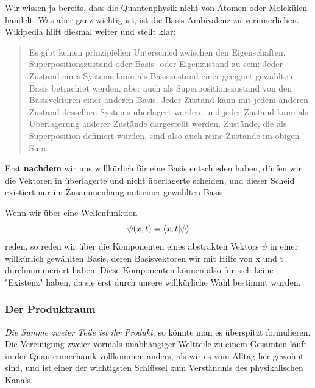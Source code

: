 \documentclass[12pt]{book}
\begin{document}
Wir wissen ja bereits, dass die Quantenphysik nicht von Atomen oder Molekülen handelt. Was aber ganz wichtig ist, ist die Basis-Ambivalenz zu verinnerlichen. Wikipedia hilft diesmal weiter und stellt klar:

\begin{quote}\begin{tcolorbox}
Es gibt keinen prinzipiellen Unterschied zwischen den Eigenschaften, Superpositionszustand oder Basis- oder Eigenzustand zu sein: Jeder Zustand eines Systems kann als Basiszustand einer geeignet gewählten Basis betrachtet werden, aber auch als Superpositionszustand von den Basisvektoren einer anderen Basis. Jeder Zustand kann mit jedem anderen Zustand desselben Systems überlagert werden, und jeder Zustand kann als Überlagerung anderer Zustände dargestellt werden. Zustände, die als Superposition definiert wurden, sind also auch reine Zustände im obigen Sinn.
\end{tcolorbox}\end{quote}
Erst \textbf{nachdem} wir uns willkürlich für eine Basis entschieden haben, dürfen wir die Vektoren in überlagerte und nicht überlagerte scheiden, und dieser Scheid existiert nur im Zusammenhang mit einer gewählten Basis.

Wenn wir über eine Wellenfunktion
\begin{equation*} 
\psi(x,t) = \braket{x,t}{\psi}
\end{equation*} 
reden, so reden wir über die Komponenten eines abstrakten Vektors $\psi$ in einer willkürlich gewählten Basis, deren Basisvektoren wir mit Hilfe von x und t durchnummeriert haben. Diese Komponenten können also für sich keine "Existenz" haben, da sie erst durch unsere willkürliche Wahl bestimmt wurden. 

\subsubsection{Der Produktraum}

\emph{Die Summe zweier Teile ist ihr Produkt}, so könnte man es überspitzt formulieren. Die Vereinigung zweier vormals unabhängiger Weltteile zu einem Gesamten läuft in der Quantenmechanik vollkommen anders, als wir es vom Alltag her gewohnt sind, und ist einer der wichtigsten Schlüssel zum Verständnis des physikalischen Kanals.
\end{document}
